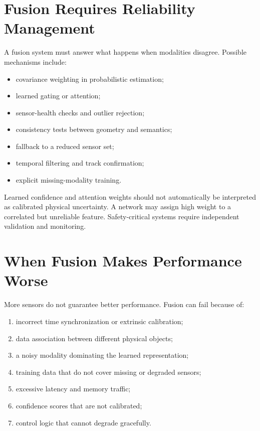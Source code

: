 \section{Fusion Requires Reliability Management}

A fusion system must answer what happens when modalities disagree. Possible mechanisms include:

\begin{itemize}
    \item covariance weighting in probabilistic estimation;
    \item learned gating or attention;
    \item sensor-health checks and outlier rejection;
    \item consistency tests between geometry and semantics;
    \item fallback to a reduced sensor set;
    \item temporal filtering and track confirmation;
    \item explicit missing-modality training.
\end{itemize}

Learned confidence and attention weights should not automatically be interpreted as calibrated physical uncertainty. A network may assign high weight to a correlated but unreliable feature. Safety-critical systems require independent validation and monitoring.

\section{When Fusion Makes Performance Worse}

More sensors do not guarantee better performance. Fusion can fail because of:

\begin{enumerate}[label=\arabic*.]
    \item incorrect time synchronization or extrinsic calibration;
    \item data association between different physical objects;
    \item a noisy modality dominating the learned representation;
    \item training data that do not cover missing or degraded sensors;
    \item excessive latency and memory traffic;
    \item confidence scores that are not calibrated;
    \item control logic that cannot degrade gracefully.
\end{enumerate}

